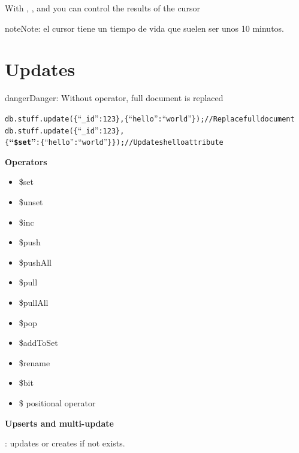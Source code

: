 \documentclass[a4paper,10pt,english]{sphinxmanual}
\begin{document}
With , , and  you can control the results of the cursor

\begin{notice}{note}{Note:}
el cursor tiene un tiempo de vida que suelen ser unos 10 minutos.
\end{notice}


\section{Updates}
\label{contents/shell:updates}
\begin{notice}{danger}{Danger:}
Without  operator, full document is replaced
\begin{alltt}
db.stuff.update( \{ ``\_id'' : 123 \} , \{ ``hello'' : ``world'' \} ) ; // Replace full document
db.stuff.update( \{ ``\_id'' : 123 \} ,
        \{ \textbf{``\$set''} : \{ ``hello'' : ``world'' \} \} ) ; // Updates hello attribute
\end{alltt}
\end{notice}

\textbf{Operators}
\begin{itemize}
\item {} 
\$set

\item {} 
\$unset

\item {} 
\$inc

\item {} 
\$push

\item {} 
\$pushAll

\item {} 
\$pull

\item {} 
\$pullAll

\item {} 
\$pop

\item {} 
\$addToSet

\item {} 
\$rename

\item {} 
\$bit

\item {} 
\$ positional operator

\end{itemize}

\textbf{Upserts and multi-update}

: updates or creates if not exists.
\end{document}
